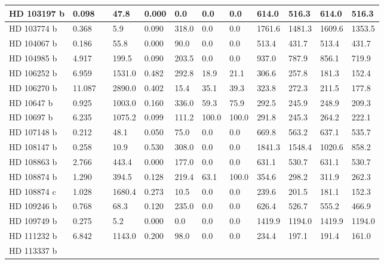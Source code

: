 \documentclass[letterpaper,10pt,english]{sphinxmanual}
\begin{document}
\begin{longtable}{|l|l|l|l|l|l|l|l|l|l|l|l|}
\hline
HD 103197 b
 & 
0.098
 &  & 
47.8
 & 
0.000
 & 
0.0
 & 
0.0
 & 
0.0
 & 
614.0
 & 
516.3
 & 
614.0
 & 
516.3
\\
\hline
HD 103774 b
 & 
0.368
 &  & 
5.9
 & 
0.090
 & 
318.0
 & 
0.0
 & 
0.0
 & 
1761.6
 & 
1481.3
 & 
1609.6
 & 
1353.5
\\
\hline
HD 104067 b
 & 
0.186
 &  & 
55.8
 & 
0.000
 & 
90.0
 & 
0.0
 & 
0.0
 & 
513.4
 & 
431.7
 & 
513.4
 & 
431.7
\\
\hline
HD 104985 b
 & 
4.917
 &  & 
199.5
 & 
0.090
 & 
203.5
 & 
0.0
 & 
0.0
 & 
937.0
 & 
787.9
 & 
856.1
 & 
719.9
\\
\hline
HD 106252 b
 & 
6.959
 &  & 
1531.0
 & 
0.482
 & 
292.8
 & 
18.9
 & 
21.1
 & 
306.6
 & 
257.8
 & 
181.3
 & 
152.4
\\
\hline
HD 106270 b
 & 
11.087
 &  & 
2890.0
 & 
0.402
 & 
15.4
 & 
35.1
 & 
39.3
 & 
323.8
 & 
272.3
 & 
211.5
 & 
177.8
\\
\hline
HD 10647 b
 & 
0.925
 &  & 
1003.0
 & 
0.160
 & 
336.0
 & 
59.3
 & 
75.9
 & 
292.5
 & 
245.9
 & 
248.9
 & 
209.3
\\
\hline
HD 10697 b
 & 
6.235
 &  & 
1075.2
 & 
0.099
 & 
111.2
 & 
100.0
 & 
100.0
 & 
291.8
 & 
245.3
 & 
264.2
 & 
222.1
\\
\hline
HD 107148 b
 & 
0.212
 &  & 
48.1
 & 
0.050
 & 
75.0
 & 
0.0
 & 
0.0
 & 
669.8
 & 
563.2
 & 
637.1
 & 
535.7
\\
\hline
HD 108147 b
 & 
0.258
 &  & 
10.9
 & 
0.530
 & 
308.0
 & 
0.0
 & 
0.0
 & 
1841.3
 & 
1548.4
 & 
1020.6
 & 
858.2
\\
\hline
HD 108863 b
 & 
2.766
 &  & 
443.4
 & 
0.000
 & 
177.0
 & 
0.0
 & 
0.0
 & 
631.1
 & 
530.7
 & 
631.1
 & 
530.7
\\
\hline
HD 108874 b
 & 
1.290
 &  & 
394.5
 & 
0.128
 & 
219.4
 & 
63.1
 & 
100.0
 & 
354.6
 & 
298.2
 & 
311.9
 & 
262.3
\\
\hline
HD 108874 c
 & 
1.028
 &  & 
1680.4
 & 
0.273
 & 
10.5
 & 
0.0
 & 
0.0
 & 
239.6
 & 
201.5
 & 
181.1
 & 
152.3
\\
\hline
HD 109246 b
 & 
0.768
 &  & 
68.3
 & 
0.120
 & 
235.0
 & 
0.0
 & 
0.0
 & 
626.4
 & 
526.7
 & 
555.2
 & 
466.9
\\
\hline
HD 109749 b
 & 
0.275
 &  & 
5.2
 & 
0.000
 & 
0.0
 & 
0.0
 & 
0.0
 & 
1419.9
 & 
1194.0
 & 
1419.9
 & 
1194.0
\\
\hline
HD 111232 b
 & 
6.842
 &  & 
1143.0
 & 
0.200
 & 
98.0
 & 
0.0
 & 
0.0
 & 
234.4
 & 
197.1
 & 
191.4
 & 
161.0
\\
\hline
HD 113337 b

\end{longtable}
\end{document}
